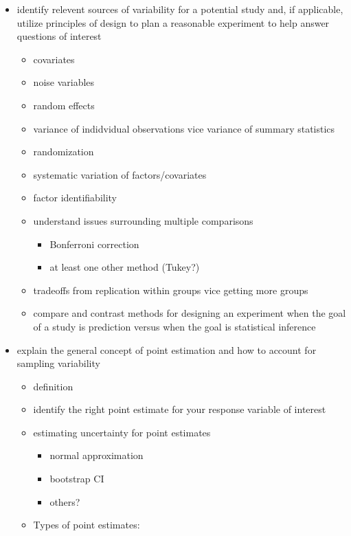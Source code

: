 \documentclass[]{book}
\providecommand{\tightlist}{%
  \setlength{\itemsep}{0pt}\setlength{\parskip}{0pt}}
\theoremstyle{definition}
\theoremstyle{definition}
\theoremstyle{definition}
\theoremstyle{remark}
\begin{document}
\begin{itemize}
\item
  identify relevent sources of variability for a potential study and, if
  applicable, utilize principles of design to plan a reasonable
  experiment to help answer questions of interest

  \begin{itemize}
  \tightlist
  \item
    covariates
  \item
    noise variables
  \item
    random effects
  \item
    variance of indidvidual observations vice variance of summary
    statistics
  \item
    randomization
  \item
    systematic variation of factors/covariates
  \item
    factor identifiability
  \item
    understand issues surrounding multiple comparisons

    \begin{itemize}
    \tightlist
    \item
      Bonferroni correction
    \item
      at least one other method (Tukey?)
    \end{itemize}
  \item
    tradeoffs from replication within groups vice getting more groups
  \item
    compare and contrast methods for designing an experiment when the
    goal of a study is prediction versus when the goal is statistical
    inference
  \end{itemize}
\item
  explain the general concept of point estimation and how to account for
  sampling variability

  \begin{itemize}
  \tightlist
  \item
    definition
  \item
    identify the right point estimate for your response variable of
    interest
  \item
    estimating uncertainty for point estimates

    \begin{itemize}
    \tightlist
    \item
      normal approximation
    \item
      bootstrap CI
    \item
      others?
    \end{itemize}
  \item
    Types of point estimates:


\end{itemize}
\end{itemize}
\end{document}
